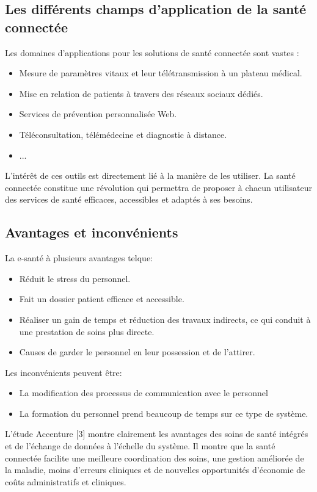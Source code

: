 \documentclass[12pt]{article}
\begin{document}
\subsection{Les différents champs d’application de la santé connectée}
Les domaines d’applications pour les solutions de santé connectée sont vastes :
\begin{itemize}
	\item Mesure de paramètres vitaux et leur télétransmission à un plateau médical.
	\item Mise en relation de patients à travers des réseaux sociaux dédiés.
	\item Services de prévention personnalisée Web.
	\item Téléconsultation, télémédecine et diagnostic à distance.
	\item ...\\
\end{itemize}

L’intérêt de ces outils est directement lié à la manière de les utiliser. La santé connectée constitue une révolution qui permettra de proposer à chacun utilisateur des services de santé efficaces, accessibles et adaptés à ses besoins.

\subsection{Avantages et inconvénients}
La e-santé à plusieurs avantages telque:
\begin{itemize}
	\item Réduit le stress du personnel.
	\item Fait un dossier patient efficace et accessible.
	\item Réaliser un gain de temps et réduction des travaux indirects, ce qui conduit à une prestation de soins plus directe.
	\item Causes de garder le personnel en leur possession et de l'attirer.
\end{itemize}

Les inconvénients peuvent être:
\begin{itemize}
	\item La modification des processus de communication avec le personnel
	\item La formation du personnel prend beaucoup de temps sur ce type de système.\\
\end{itemize}

L'étude Accenture [3] montre clairement les avantages des soins de santé intégrés et de l'échange de données à l'échelle du système. Il montre que la santé connectée facilite une meilleure coordination des soins, une gestion améliorée de la maladie, moins d'erreurs cliniques et de nouvelles opportunités d'économie de coûts administratifs et cliniques.
\end{document}
